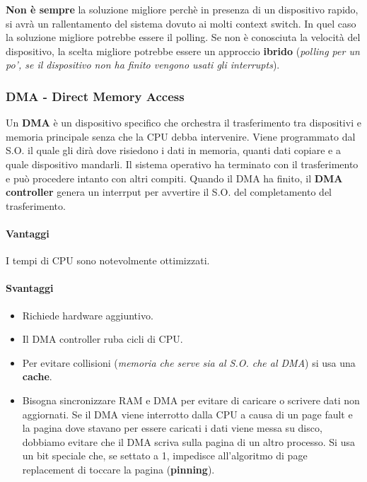 \documentclass[12pt, twoside, letterpaper]{article}
\begin{document}
				\textbf{Non è sempre }la soluzione migliore perchè in presenza di un dispositivo rapido, si avrà un rallentamento del sistema dovuto ai molti context switch. In quel caso la soluzione migliore potrebbe essere il polling. Se non è conosciuta la velocità del dispositivo, la scelta migliore potrebbe essere un approccio \textbf{ibrido} (\textit{polling per un po', se il dispositivo non ha finito vengono usati gli interrupts}). 
				
			\subsubsection{DMA - Direct Memory Access}
				Un \textbf{DMA} è un dispositivo specifico che orchestra il trasferimento tra dispositivi e memoria principale senza che la CPU debba intervenire. Viene programmato dal S.O. il quale gli dirà dove risiedono i dati in memoria, quanti dati copiare e a quale dispositivo mandarli. Il sistema operativo ha terminato con il trasferimento e può procedere intanto con altri compiti. Quando il DMA ha  finito, il \textbf{DMA controller} genera un interrput per avvertire il S.O. del completamento del trasferimento.
				\paragraph{Vantaggi} I tempi di CPU sono notevolmente ottimizzati.
				\paragraph{Svantaggi}
				\begin{itemize}
					\item Richiede hardware aggiuntivo.
					\item Il DMA controller ruba cicli di CPU.
					\item Per evitare collisioni (\textit{memoria che serve sia al S.O. che al DMA}) si usa una \textbf{cache}.
					\item Bisogna sincronizzare RAM e DMA per evitare di caricare o scrivere dati non aggiornati. Se il DMA viene interrotto dalla CPU a causa di un page fault e la pagina dove stavano per essere caricati i dati viene messa su disco, dobbiamo evitare che il DMA scriva sulla pagina di un altro processo. Si usa un bit speciale che, se settato a 1, impedisce all'algoritmo di page replacement di toccare la pagina (\textbf{pinning}).
				\end{itemize}
				
\end{document}
